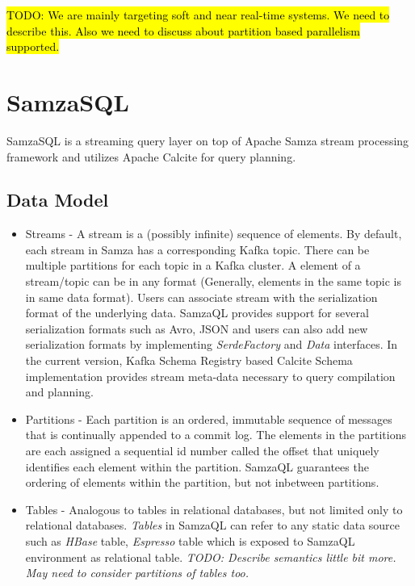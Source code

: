 \documentclass[10pt, conference, compsocconf]{IEEEtran}
\begin{document}
\hl{TODO: We are mainly targeting soft and near real-time systems. We need to describe this. Also we need to discuss about partition based parallelism supported.}

\section{SamzaSQL}
SamzaSQL is a streaming query layer on top of Apache Samza stream processing framework and utilizes Apache Calcite \cite{asf:2014:calcite} for query planning. 

\subsection{Data Model}

\begin{itemize}
\item Streams - A stream is a (possibly infinite) sequence of elements. By default, each stream in Samza has a corresponding Kafka \cite{kreps2011kafka} topic. There can be multiple partitions for each topic in a Kafka cluster. A element of a stream/topic can be in any format (Generally, elements in the same topic is in same data format). Users can associate stream with the serialization format of the underlying data. SamzaQL provides support for several serialization formats such as Avro, JSON and users can also add new serialization formats by implementing \textit{SerdeFactory} and \textit{Data} interfaces. In the current version, Kafka Schema Registry based Calcite Schema implementation provides stream meta-data necessary to query compilation and planning.
\item Partitions - Each partition is an ordered, immutable sequence of messages that is continually appended to a commit log. The elements in the partitions are each assigned a sequential id number called the offset that uniquely identifies each element within the partition. SamzaQL guarantees the ordering of elements within the partition, but not inbetween partitions.
\item Tables - Analogous to tables in relational databases, but not limited only to relational databases. \textit{Tables} in SamzaQL can refer to any static data source such as \textit{HBase} table, \textit{Espresso} table  which is exposed to SamzaQL environment as relational table. \textit{TODO: Describe semantics little bit more. May need to consider partitions of tables too.}
\end{itemize}
\end{document}
